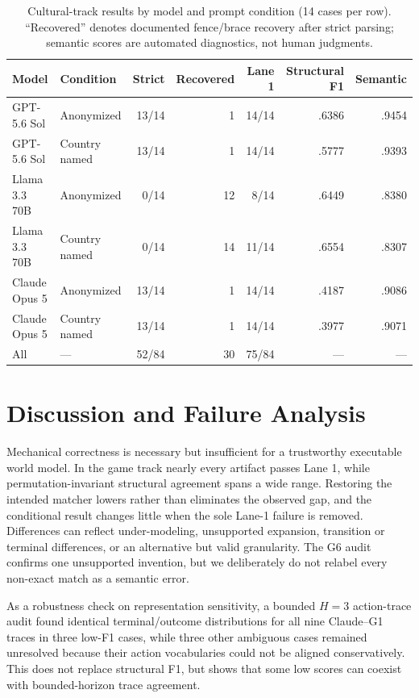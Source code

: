 \documentclass{article}
\begin{document}
\begin{table}[t]
\centering
\small
\caption{Cultural-track results by model and prompt condition (14 cases per row). ``Recovered'' denotes documented fence/brace recovery after strict parsing; semantic scores are automated diagnostics, not human judgments.}
\label{tab:cultural}
\begin{tabular}{llrrrrr}
\toprule
Model & Condition & Strict & Recovered & Lane 1 & Structural F1 & Semantic \\
\midrule
GPT-5.6 Sol & Anonymized & 13/14 & 1 & 14/14 & .6386 & .9454 \\
GPT-5.6 Sol & Country named & 13/14 & 1 & 14/14 & .5777 & .9393 \\
Llama 3.3 70B & Anonymized & 0/14 & 12 & 8/14 & .6449 & .8380 \\
Llama 3.3 70B & Country named & 0/14 & 14 & 11/14 & .6554 & .8307 \\
Claude Opus 5 & Anonymized & 13/14 & 1 & 14/14 & .4187 & .9086 \\
Claude Opus 5 & Country named & 13/14 & 1 & 14/14 & .3977 & .9071 \\
\midrule
All & --- & 52/84 & 30 & 75/84 & --- & --- \\
\bottomrule
\end{tabular}
\end{table}

\section{Discussion and Failure Analysis}
Mechanical correctness is necessary but insufficient for a trustworthy executable world model. In the game track nearly every artifact passes Lane 1, while permutation-invariant structural agreement spans a wide range. Restoring the intended matcher lowers rather than eliminates the observed gap, and the conditional result changes little when the sole Lane-1 failure is removed. Differences can reflect under-modeling, unsupported expansion, transition or terminal differences, or an alternative but valid granularity. The G6 audit confirms one unsupported invention, but we deliberately do not relabel every non-exact match as a semantic error.

As a robustness check on representation sensitivity, a bounded $H=3$ action-trace audit found identical terminal/outcome distributions for all nine Claude--G1 traces in three low-F1 cases, while three other ambiguous cases remained unresolved because their action vocabularies could not be aligned conservatively. This does not replace structural F1, but shows that some low scores can coexist with bounded-horizon trace agreement.
\end{document}
